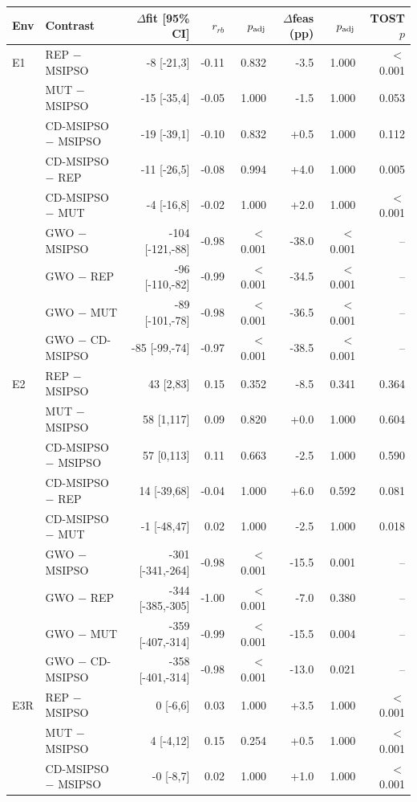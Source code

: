 \begin{tabular}{llrrrrrr}
\toprule
Env & Contrast & $\Delta$fit [95\% CI] & $r_{rb}$ & $p_{\rm adj}$ & $\Delta$feas (pp) & $p_{\rm adj}$ & TOST $p$\\
\midrule
E1 & REP $-$ MSIPSO & -8 [-21,3] & -0.11 & 0.832 & -3.5 & 1.000 & $<$0.001\\
 & MUT $-$ MSIPSO & -15 [-35,4] & -0.05 & 1.000 & -1.5 & 1.000 & 0.053\\
 & CD-MSIPSO $-$ MSIPSO & -19 [-39,1] & -0.10 & 0.832 & +0.5 & 1.000 & 0.112\\
 & CD-MSIPSO $-$ REP & -11 [-26,5] & -0.08 & 0.994 & +4.0 & 1.000 & 0.005\\
 & CD-MSIPSO $-$ MUT & -4 [-16,8] & -0.02 & 1.000 & +2.0 & 1.000 & $<$0.001\\
 & GWO $-$ MSIPSO & -104 [-121,-88] & -0.98 & $<$0.001 & -38.0 & $<$0.001 & --\\
 & GWO $-$ REP & -96 [-110,-82] & -0.99 & $<$0.001 & -34.5 & $<$0.001 & --\\
 & GWO $-$ MUT & -89 [-101,-78] & -0.98 & $<$0.001 & -36.5 & $<$0.001 & --\\
 & GWO $-$ CD-MSIPSO & -85 [-99,-74] & -0.97 & $<$0.001 & -38.5 & $<$0.001 & --\\
\midrule
E2 & REP $-$ MSIPSO & 43 [2,83] & 0.15 & 0.352 & -8.5 & 0.341 & 0.364\\
 & MUT $-$ MSIPSO & 58 [1,117] & 0.09 & 0.820 & +0.0 & 1.000 & 0.604\\
 & CD-MSIPSO $-$ MSIPSO & 57 [0,113] & 0.11 & 0.663 & -2.5 & 1.000 & 0.590\\
 & CD-MSIPSO $-$ REP & 14 [-39,68] & -0.04 & 1.000 & +6.0 & 0.592 & 0.081\\
 & CD-MSIPSO $-$ MUT & -1 [-48,47] & 0.02 & 1.000 & -2.5 & 1.000 & 0.018\\
 & GWO $-$ MSIPSO & -301 [-341,-264] & -0.98 & $<$0.001 & -15.5 & 0.001 & --\\
 & GWO $-$ REP & -344 [-385,-305] & -1.00 & $<$0.001 & -7.0 & 0.380 & --\\
 & GWO $-$ MUT & -359 [-407,-314] & -0.99 & $<$0.001 & -15.5 & 0.004 & --\\
 & GWO $-$ CD-MSIPSO & -358 [-401,-314] & -0.98 & $<$0.001 & -13.0 & 0.021 & --\\
\midrule
E3R & REP $-$ MSIPSO & 0 [-6,6] & 0.03 & 1.000 & +3.5 & 1.000 & $<$0.001\\
 & MUT $-$ MSIPSO & 4 [-4,12] & 0.15 & 0.254 & +0.5 & 1.000 & $<$0.001\\
 & CD-MSIPSO $-$ MSIPSO & -0 [-8,7] & 0.02 & 1.000 & +1.0 & 1.000 & $<$0.001\\

\end{tabular}
